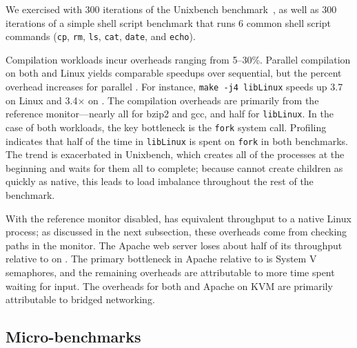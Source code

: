 We exercised \busy{} with 
300 iterations of the Unixbench benchmark~\cite{unixbench}, as well as 
300 iterations of a simple shell script benchmark that runs 6 common shell script commands
({\tt cp}, {\tt rm}, {\tt ls}, {\tt cat}, {\tt date}, and {\tt echo}).

Compilation workloads incur overheads ranging from 5--30\%.
Parallel compilation on both \graphene{} and Linux yields comparable  speedups  over sequential,
but the percent overhead increases for parallel \graphene{}.
For instance, {\tt make -j4 libLinux} speeds up 3.7\x{} on Linux and 3.4$\times$ on \graphene{}.
The compilation overheads are primarily from the reference monitor---nearly all for bzip2 and gcc, and half for {\tt libLinux}.
In the case of both \busy{} workloads, the key bottleneck is the {\tt fork} system call.
Profiling indicates that half of the time in {\tt libLinux} is spent on {\tt fork} in both benchmarks.
The trend is exacerbated in Unixbench, which creates all of the processes at the beginning and
waits for them all to complete; because \graphene{} cannot create children as quickly as native, this leads to 
load imbalance throughout the rest of the benchmark.  

With the reference monitor disabled,  \lighttpd{} has equivalent throughput to a native Linux process;
as discussed in the next subsection, these overheads come from checking paths in the monitor.
The Apache web server loses about half of its throughput relative to \lighttpd{} on \graphene{}.
The primary bottleneck in Apache relative to \lighttpd{} is System V semaphores,
and the remaining overheads are attributable to more time spent waiting for input.
The overheads for both \lighttpd{} and Apache on KVM are primarily attributable
to bridged networking.





\subsection{Micro-benchmarks}
\label{sec:eval:graphene:mbench}

